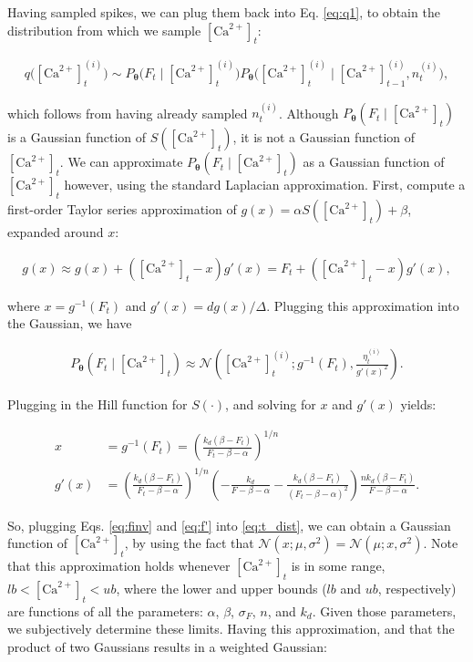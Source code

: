 \documentclass[12pt]{article}
\providecommand{\ve}[1]{\boldsymbol{#1}}
\providecommand{\ve}[1]{\boldsymbol{#1}}
\newcommand{\thetn}{\ve{\theta}}
\newcommand{\p}{P_{\thetn}}
\newcommand{\Ca}{[\text{Ca}^{2+}]}
\begin{document}
Having sampled spikes, we can plug them back into Eq. \ref{eq:q1}, to obtain the distribution from which we sample $\Ca_t$:

\begin{align} \label{eq:q_C}
q\big(\Ca_t^{(i)}\big) \sim \p\big(F_t \mid \Ca_t^{(i)}\big) \p\big(\Ca_t^{(i)} \mid \Ca_{t-1}^{(i)}, n_t^{(i)}\big),
\end{align} 

\noindent which follows from having already sampled $n_t^{(i)}$. Although $\p(F_t \mid \Ca_t)$ is a Gaussian function of $S(\Ca_t)$, it is not a Gaussian function of $\Ca_t$.  We can approximate $\p(F_t \mid \Ca_t)$ as a Gaussian function of $\Ca_t$ however, using the standard Laplacian approximation.   First, compute a first-order Taylor series approximation of $g(x)=\alpha S(\Ca_t)+\beta$, expanded around $x$:

\begin{align}
g(x) \approx g(x) + (\Ca_t - x) g'(x) = F_t + (\Ca_t - x) g'(x),
\end{align}

\noindent where $x = g^{-1}(F_t)$ and $g'(x)=dg(x)/\Delta$. Plugging this approximation into the Gaussian, we have

\begin{align} \label{eq:t_dist}
\p(F_t \mid \Ca_t) \approx \mathcal{N}\left(\Ca_t^{(i)}; g^{-1}(F_t), \frac{\eta_t^{(i)}}{g'(x)^2}\right).
\end{align}

\noindent Plugging in the Hill function for $S(\cdot)$, and solving for $x$ and $g'(x)$ yields:

\begin{align} \label{eq:finv}
x &= g^{-1}(F_t) =  \left(\frac{k_d (\beta - F_t)}{F_t - \beta - \alpha}\right)^{1/n}\\ \label{eq:f'}
g'(x) &= \left(\frac{k_d (\beta -F_t)}{F_t - \beta - \alpha}\right)^{1/n} \left(-\frac{k_d}{F-\beta-\alpha}-\frac{k_d(\beta-F_t)}{(F_t-\beta-\alpha)^2}\right) \frac{n k_d (\beta - F_t)}{F-\beta-\alpha}.
\end{align}

\noindent So, plugging Eqs. \ref{eq:finv} and \ref{eq:f'} into \ref{eq:t_dist}, we can obtain a Gaussian function of $\Ca_t$, by using the fact that $\mathcal{N}(x;\mu,\sigma^2)=\mathcal{N}(\mu;x,\sigma^2)$. Note that this approximation holds whenever $\Ca_t$ is in some range, $lb<\Ca_t<ub$, where the lower and upper bounds ($lb$ and $ub$, respectively) are functions of all the parameters: $\alpha$, $\beta$, $\sigma_F$, $n$, and $k_d$. Given those parameters, we subjectively determine these limits. Having this approximation, and that the product of two Gaussians results in a weighted Gaussian:
\end{document}

